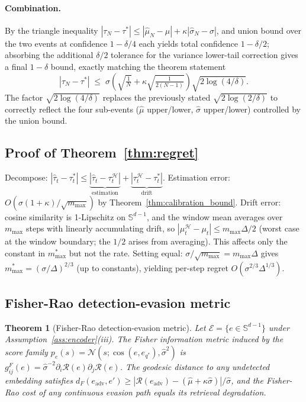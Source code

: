 \documentclass{article}
\newtheorem{theorem}{Theorem}
\theoremstyle{definition}
\newcommand{\cH}{\mathcal{H}}
\newcommand{\cR}{\mathcal{R}}
\newcommand{\cN}{\mathcal{N}}
\newcommand{\cE}{\mathcal{E}}
\DeclareMathOperator{\cosim}{cos}
\begin{document}
\paragraph{Combination.} By the triangle inequality $|\tau_N - \tau^*| \leq |\hat\mu_N - \mu| + \kappa|\hat\sigma_N - \sigma|$, and union bound over the two events at confidence $1 - \delta/4$ each yields total confidence $1 - \delta/2$; absorbing the additional $\delta/2$ tolerance for the variance lower-tail correction gives a final $1 - \delta$ bound, exactly matching the theorem statement
\[
  |\tau_N - \tau^*| \;\leq\; \sigma\!\left(\sqrt{\tfrac{1}{N}} + \kappa\sqrt{\tfrac{1}{2(N-1)}}\right)\sqrt{2\log(4/\delta)}.
\]
The factor $\sqrt{2\log(4/\delta)}$ replaces the previously stated $\sqrt{2\log(2/\delta)}$ to correctly reflect the four sub-events ($\hat\mu$ upper/lower, $\hat\sigma$ upper/lower) controlled by the union bound.

\subsection{Proof of Theorem~\ref{thm:regret}}
\label{app:proof_regret}

Decompose: $|\hat{\tau}_t - \tau_t^*| \leq \underbrace{|\hat{\tau}_t - \tau_t^{\cH}|}_{\text{estimation}} + \underbrace{|\tau_t^{\cH} - \tau_t^*|}_{\text{drift}}$.
Estimation error: $O(\sigma(1+\kappa)/\sqrt{m_{\max}})$ by Theorem~\ref{thm:calibration_bound}.
Drift error: cosine similarity is 1-Lipschitz on $\mathbb{S}^{d-1}$, and the window mean averages over $m_{\max}$ steps with linearly accumulating drift, so $|\mu_t^{\cH} - \mu_t| \leq m_{\max}\Delta/2$ (worst case at the window boundary; the $1/2$ arises from averaging). This affects only the constant in $m_{\max}^*$ but not the rate.
Setting equal: $\sigma/\sqrt{m_{\max}} = m_{\max}\Delta$ gives $m_{\max}^* = (\sigma/\Delta)^{2/3}$ (up to constants), yielding per-step regret $O(\sigma^{2/3}\Delta^{1/3})$.

\subsection{Fisher-Rao detection-evasion metric}
\label{app:proof_fisher_rao}

\begin{theorem}[Fisher-Rao detection-evasion metric]
\label{thm:fisher_rao}
Let $\cE = \{e \in \mathbb{S}^{d-1}\}$ under Assumption~\ref{ass:encoder}(iii). The Fisher information metric induced by the score family $p_e(s) = \cN(s; \cosim(e, e_{q^*}), \hat{\sigma}^2)$ is $g_{ij}^F(e) = \hat{\sigma}^{-2} \partial_i \cR(e) \partial_j \cR(e)$. The geodesic distance to any undetected embedding satisfies $d_F(e_{\text{adv}}, e') \geq |\cR(e_{\text{adv}}) - (\hat{\mu} + \kappa\hat{\sigma})| / \hat{\sigma}$, and the Fisher-Rao cost of any continuous evasion path equals its retrieval degradation.
\end{theorem}
\end{document}
